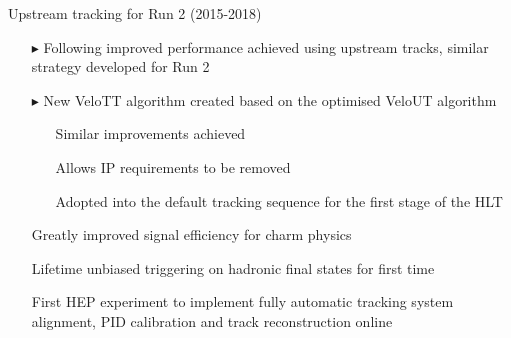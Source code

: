 \documentclass[aspectratio=1610]{beamer}
\begin{document}
\begin{frame}{Upstream tracking for \lhcb Run 2 (2015-2018)}

\begin{itemize}
  \item[$\blacktriangleright$] Following improved performance achieved using upstream tracks, similar strategy developed for Run 2
  \item[$\blacktriangleright$]   New VeloTT algorithm created based on the optimised VeloUT algorithm
  \begin{itemize}
    \item[\ding{80}] Similar improvements achieved
    \item[\ding{80}] Allows IP requirements to be removed
    \item[\ding{80}] Adopted into the default tracking sequence for the first stage of the HLT
  \end{itemize}
\end{itemize}

\begin{itemize}
  \item[\ding{80}] Greatly improved signal efficiency for charm physics
  \item[\ding{80}] Lifetime unbiased triggering on hadronic final states for first time
\end{itemize}

\begin{itemize}
\item[\ding{80}] First HEP experiment to implement fully automatic tracking system alignment, PID calibration and track reconstruction online
\end{itemize}

\end{frame}
\end{document}
